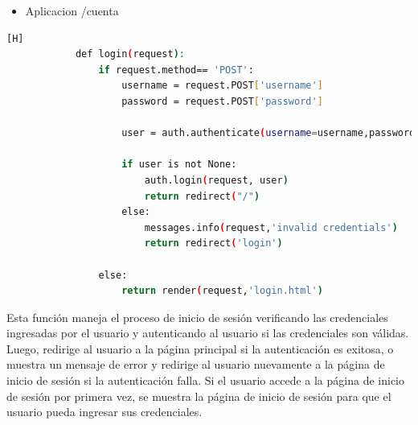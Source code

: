 \documentclass{article}
\begin{document}
	\begin{itemize}	
		\item Aplicacion /cuenta
	\end{itemize}
	\begin{lstlisting}[language=bash,caption={Primera funcion de views.py}][H]
            def login(request):
                if request.method== 'POST':
                    username = request.POST['username']
                    password = request.POST['password']
            
                    user = auth.authenticate(username=username,password=password)
            
                    if user is not None:
                        auth.login(request, user)
                        return redirect("/")
                    else:
                        messages.info(request,'invalid credentials')
                        return redirect('login')
            
                else:
                    return render(request,'login.html') 
	\end{lstlisting}
  Esta función maneja el proceso de inicio de sesión verificando las credenciales ingresadas por el usuario y autenticando al usuario si las credenciales son válidas. Luego, redirige al usuario a la página principal si la autenticación es exitosa, o muestra un mensaje de error y redirige al usuario nuevamente a la página de inicio de sesión si la autenticación falla. Si el usuario accede a la página de inicio de sesión por primera vez, se muestra la página de inicio de sesión para que el usuario pueda ingresar sus credenciales.
\end{document}

